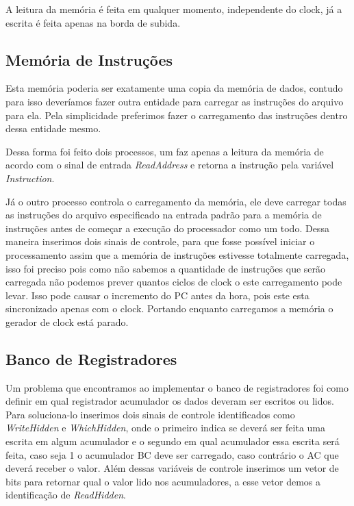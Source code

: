 \documentclass[12pt]{article}
\begin{document}
A leitura da memória é feita em qualquer momento, independente do clock, já a escrita é feita apenas na borda de subida.

\subsection{Memória de Instruções}

Esta memória poderia ser exatamente uma copia da memória de dados, contudo para isso deveríamos fazer outra entidade para carregar as instruções do arquivo para ela. Pela simplicidade preferimos fazer o carregamento das instruções dentro dessa entidade mesmo.

Dessa forma foi feito dois processos, um faz apenas a leitura da memória de acordo com o sinal de entrada \textit{ReadAddress} e retorna a instrução pela variável \textit{Instruction}.

Já o outro processo controla o carregamento da memória, ele deve carregar todas as instruções do arquivo especificado na entrada padrão para a memória de instruções antes de começar a execução do processador como um todo. 
Dessa maneira inserimos dois sinais de controle, para que fosse possível iniciar o processamento assim que a memória de instruções estivesse totalmente carregada, isso foi preciso pois como não sabemos a quantidade de instruções que serão carregada não podemos prever quantos ciclos de clock o este carregamento pode levar. Isso pode causar o incremento do PC antes da hora, pois este esta sincronizado apenas com o clock. Portando enquanto carregamos a memória o gerador de clock está parado.

\subsection{Banco de Registradores}

Um problema que encontramos ao implementar o banco de registradores foi como definir em qual registrador acumulador os dados deveram ser escritos ou lidos. Para soluciona-lo inserimos dois sinais de controle identificados como \textit{WriteHidden} e \textit{WhichHidden}, onde o primeiro indica se deverá ser feita uma escrita em algum acumulador e o segundo em qual acumulador essa escrita será feita, caso seja 1 o acumulador BC deve ser carregado, caso contrário o AC que deverá receber o valor. Além dessas variáveis de controle inserimos um vetor de bits para retornar qual o valor lido nos acumuladores, a esse vetor demos a identificação de \textit{ReadHidden}.
\end{document}
